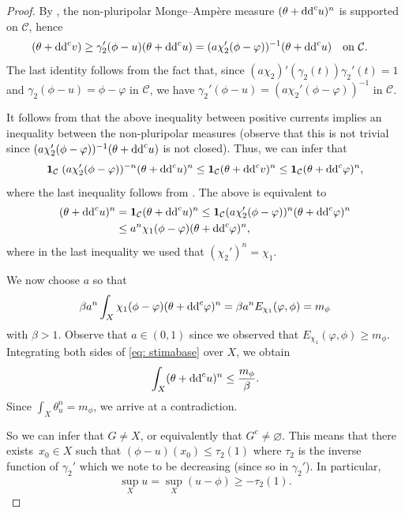 \documentclass[pdftex]{sigma}
\numberwithin{equation}{section}
\theoremstyle{plain}
\newcommand{\f}{\varphi}
\begin{document}
\begin{proof}
By \cite[Theorem 2.7]{DDL6}, the non-pluripolar Monge--Amp\`ere measure $(\theta+{\rm dd}^c u)^n$ is supported on $\mathcal{C}$, hence
\begin{align*}%
	(\theta+{\rm dd}^c v) &\geq \gamma_2'(\phi-u) (\theta+{\rm dd}^c u)
		 = (a\chi_2'(\phi-\varphi))^{-1} (\theta+{\rm dd}^c u)\quad \text{on $\mathcal{C}$}.
\end{align*}
The last identity follows from the fact that, since $(a\chi_2)'(\gamma_2(t))\gamma_2'(t)=1$ and $\gamma_2(\phi-u)=\phi-\varphi$ in $\mathcal{C}$, we have $\gamma_2'(\phi-u)= (a\chi_2'(\phi-\varphi))^{-1}$ in $\mathcal{C}$.

It follows from \cite[Lemma 5.19]{DDL6} that the above inequality between positive currents implies an inequality between the non-pluripolar measures (observe that this is not trivial since $(a\chi_2'(\phi-\varphi))^{-1} (\theta+{\rm dd}^c u)$ is not closed).
Thus, we can infer that
\begin{equation*}
 {\bf 1}_{\mathcal{C}} \;(a\chi_2'(\phi-\varphi))^{-n} (\theta+{\rm dd}^c u)^n
	\leq {\bf 1}_{\mathcal{C}}(\theta+{\rm dd}^c v)^n \leq {\bf 1}_{\mathcal{C}}(\theta+{\rm dd}^c \varphi)^n,
\end{equation*}
where the last inequality follows from \cite[Lemma 4.5]{DDL5}. The above is equivalent to
\begin{align}
 (\theta+{\rm dd}^c u)^n &={\bf 1}_{ \mathcal{C}} (\theta+{\rm dd}^c u)^n \leq {\bf 1}_{ \mathcal{C}} (a\chi_2'(\phi-\varphi))^{n}(\theta+{\rm dd}^c \f)^n\nonumber\\
 &\leq a^n \chi_1(\phi-\varphi)(\theta+{\rm dd}^c \f)^n, \label{eq: stimabase}
\end{align}
where in the last inequality we used that $(\chi_2')^n=\chi_1$.

We now choose $a$ so that
\[
\beta a^n \int_X \chi_1(\phi-\varphi) (\theta+{\rm dd}^c \varphi)^n=\beta a^n E_{\chi_1}(\varphi, \phi) = m_\phi
\]
 with $\beta > 1$.
Observe that $a\in(0,1)$ since we observed that $E_{\chi_1}(\varphi, \phi)\geq m_\phi$.
Integrating both sides of \eqref{eq: stimabase} over $X$, we obtain
\[
\int_X (\theta+{\rm dd}^c u)^n \leq \frac{m_\phi}{\beta}.
\]
Since $\int_X \theta_u^n=m_\phi$, we arrive at a contradiction.

So we can infer that $G\neq X$, or equivalently that $G^c\neq \varnothing$. This means that there exists~${x_0\in X}$ such that $(\phi-u)(x_0)\leq \tau_2(1)$ where $\tau_2$ is the inverse function of $\gamma_2'$ which we note to be decreasing (since so in $\gamma_2'$). In particular,
\[\sup_X u =\sup_X (u-\phi) \geq -\tau_2(1).\]


\end{proof}
\end{document}
